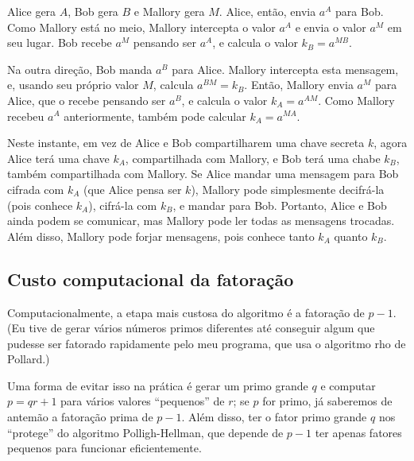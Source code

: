 \documentclass{article}
\begin{document}
Alice gera $A$, Bob gera $B$ e Mallory gera $M$.
Alice, então, envia $a^A$ para Bob.
Como Mallory está no meio,
Mallory intercepta o valor $a^A$
e envia o valor $a^M$ em seu lugar.
Bob recebe $a^M$ pensando ser $a^A$,
e calcula o valor $k_B = a^{MB}$.

Na outra direção,
Bob manda $a^B$ para Alice.
Mallory intercepta esta mensagem,
e, usando seu próprio valor $M$,
calcula $a^{BM} = k_B$.
Então, Mallory envia $a^M$ para Alice,
que o recebe pensando ser $a^B$, e calcula o valor $k_A = a^{AM}$.
Como Mallory recebeu $a^A$ anteriormente,
também pode calcular $k_A = a^{MA}$.

Neste instante,
em vez de Alice e Bob compartilharem uma chave secreta $k$,
agora Alice terá uma chave $k_A$,
compartilhada com Mallory,
e Bob terá uma chabe $k_B$,
também compartilhada com Mallory.
Se Alice mandar uma mensagem para Bob cifrada com $k_A$
(que Alice pensa ser $k$),
Mallory pode simplesmente decifrá-la (pois conhece $k_A$),
cifrá-la com $k_B$, e mandar para Bob.
Portanto, Alice e Bob ainda podem se comunicar,
mas Mallory pode ler todas as mensagens trocadas.
Além disso, Mallory pode forjar mensagens,
pois conhece tanto $k_A$ quanto $k_B$.

\subsection{Custo computacional da fatoração}
Computacionalmente,
a etapa mais custosa do algoritmo é a fatoração de $p-1$.
(Eu tive de gerar vários números primos diferentes
até conseguir algum que pudesse ser fatorado rapidamente pelo meu programa,
que usa o algoritmo rho de Pollard.)

Uma forma de evitar isso na prática é gerar um primo grande $q$
e computar $p = qr + 1$ para vários valores ``pequenos'' de $r$;
se $p$ for primo,
já saberemos de antemão a fatoração prima de $p-1$.
Além disso, ter o fator primo grande $q$
nos ``protege'' do algoritmo Polligh-Hellman,
que depende de $p-1$ ter apenas fatores pequenos para funcionar eficientemente.
\end{document}
